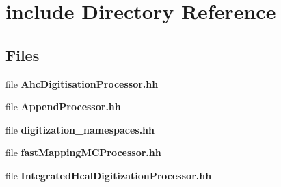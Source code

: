 \section{include Directory Reference}
\label{dir_0411c20f1913e061e8c5b1cdc0be980d}
\subsection*{Files}
\begin{DoxyCompactItemize}
\item 
file {\bfseries Ahc\-Digitisation\-Processor.\-hh}
\item 
file {\bfseries Append\-Processor.\-hh}
\item 
file {\bfseries digitization\-\_\-namespaces.\-hh}
\item 
file {\bfseries fast\-Mapping\-M\-C\-Processor.\-hh}
\item 
file {\bfseries Integrated\-Hcal\-Digitization\-Processor.\-hh}
\end{DoxyCompactItemize}
